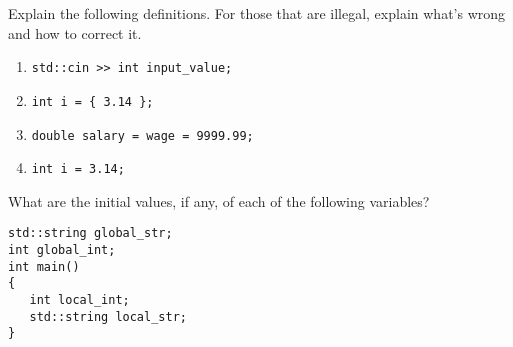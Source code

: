 %
%
\begin{question}
Explain the following definitions. For those that are illegal,
explain what’s wrong and how to correct it.
\begin{enumerate}[label=(\alph*)]
^^I\item \verb|std::cin >> int input_value;|
^^I\item \verb|int i = { 3.14 };|
^^I\item \verb|double salary = wage = 9999.99;|
^^I\item \verb|int i = 3.14;|
\end{enumerate}
\end{question}

\begin{question}
What are the initial values, if any, of each of the following
variables?
\begin{lstlisting}
std::string global_str;
int global_int;
int main()
{
   int local_int;
   std::string local_str;
}
\end{lstlisting}
\end{question}
